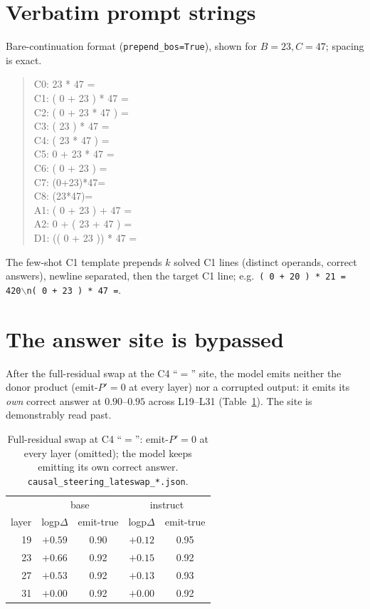 \section{Verbatim prompt strings}
\label{app:prompts}
Bare-continuation format (\texttt{prepend\_bos=True}), shown for $B{=}23, C{=}47$; spacing is exact.
\begin{quote}\ttfamily\small
C0: 23 * 47 =\\
C1: ( 0 + 23 ) * 47 =\\
C2: ( 0 + 23 * 47 ) =\\
C3: ( 23 ) * 47 =\\
C4: ( 23 * 47 ) =\\
C5: 0 + 23 * 47 =\\
C6: ( 0 + 23 ) =\\
C7: (0+23)*47=\\
C8: (23*47)=\\
A1: ( 0 + 23 ) + 47 =\\
A2: 0 + ( 23 + 47 ) =\\
D1: (( 0 + 23 )) * 47 =
\end{quote}
The few-shot C1 template prepends $k$ solved C1 lines (distinct operands, correct answers), newline
separated, then the target C1 line; e.g.\ \texttt{( 0 + 20 ) * 21 = 420$\backslash$n( 0 + 23 ) * 47 =}.

\section{The answer site is bypassed}
\label{app:emit_true}
After the full-residual swap at the C4 ``$=$'' site, the model emits neither the donor product
(emit-$P' = 0$ at every layer) nor a corrupted output: it emits its \emph{own} correct answer at
$0.90$--$0.95$ across L19--L31 (Table~\ref{tab:emit}). The site is demonstrably read past.

\begin{table}[h]
\centering
\footnotesize
\setlength{\tabcolsep}{4pt}
\begin{tabular}{@{}rcccc@{}}
\toprule
 & \multicolumn{2}{c}{base} & \multicolumn{2}{c}{instruct} \\
layer & logp$\Delta$ & emit-true & logp$\Delta$ & emit-true \\
\midrule
19 & $+0.59$ & 0.90 & $+0.12$ & 0.95 \\
23 & $+0.66$ & 0.92 & $+0.15$ & 0.92 \\
27 & $+0.53$ & 0.92 & $+0.13$ & 0.93 \\
31 & $+0.00$ & 0.92 & $+0.00$ & 0.92 \\
\bottomrule
\end{tabular}
\caption{Full-residual swap at C4 ``$=$'': emit-$P' = 0$ at every layer (omitted); the model keeps
emitting its own correct answer. \texttt{causal\_steering\_lateswap\_*.json}.}
\label{tab:emit}
\end{table}


